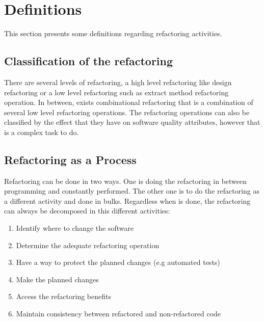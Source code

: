 \section{Definitions}


This section presents some definitions regarding refactoring activities.

\subsection{Classification of the refactoring}
There are several levels of refactoring, a high level refactoring like design refactoring or a low level refactoring such as extract method refactoring operation. 
In between, exists combinational refactoring that is a combination of several low level refactoring operations.
The refactoring operations can also be classified by the effect that they have on software quality attributes, however that is a complex task to do. \cite{elish2011classification}

\subsection{Refactoring as a Process}
Refactoring can be done in two ways. %
One is doing the refactoring in between programming and constantly performed. 
The other one is to do the refactoring as a different activity and done in bulks.
Regardless when is done, the refactoring can always be decomposed in this different activities: \cite{erb2010survey}

\begin{enumerate}
 \item Identify where to change the software
 \item Determine the adequate refactoring operation
 \item Have a way to protect the planned changes (e.g automated tests)
 \item Make the planned changes
 \item Access the refactoring benefits
 \item Maintain consistency between refactored and non-refactored code 
\end{enumerate}




